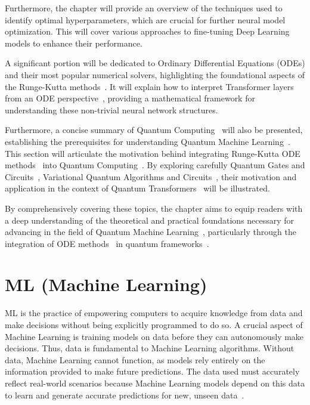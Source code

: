 \documentclass[12pt,a4paper]{report}
\begin{document}
Furthermore, the chapter will provide an overview of the techniques used to identify optimal hyperparameters, which are crucial for further neural model optimization. This will cover various approaches to fine-tuning Deep Learning models to enhance their performance.

A significant portion will be dedicated to Ordinary Differential Equations (ODEs) and their most popular numerical solvers, highlighting the foundational aspects of the Runge-Kutta methods~\cite{butcher1996history}. It will explain how to interpret Transformer layers from an ODE perspective~\cite{li2022ode}, providing a mathematical framework for understanding these non-trivial neural network structures.

Furthermore, a concise summary of Quantum Computing~\cite{nielsen2001quantum} will also be presented, establishing the prerequisites for understanding Quantum Machine Learning~\cite{dunjko2018machine}. This section will articulate the motivation behind integrating Runge-Kutta ODE methods~\cite{butcher1996history, fan2024Quantum} into Quantum Computing~\cite{nielsen2001quantum}. By exploring carefully Quantum Gates and Circuits~\cite{barenco1995elementary, benedetti2019parameterized}, Variational Quantum Algorithms and Circuits~\cite{cerezo2021variational, benedetti2019parameterized}, their motivation and application in the context of Quantum Transformers~\cite{Comajoan_Cara_2024} will be illustrated.

By comprehensively covering these topics, the chapter aims to equip readers with a deep understanding of the theoretical and practical foundations necessary for advancing in the field of Quantum Machine Learning~\cite{dunjko2018machine}, particularly through the integration of ODE methods~\cite{zhong2022neural} in quantum frameworks~\cite{Zhang_2023}.

\section{ML (Machine Learning)}\vspace{-12pt}
ML is the practice of empowering computers to acquire knowledge from data and make decisions without being explicitly programmed to do so. A crucial aspect of Machine Learning is training models on data before they can autonomously make decisions. Thus, data is fundamental to Machine Learning algorithms. Without data, Machine Learning cannot function, as models rely entirely on the information provided to make future predictions. The data used must accurately reflect real-world scenarios because Machine Learning models depend on this data to learn and generate accurate predictions for new, unseen data~\cite{machinelearning}.
\end{document}
